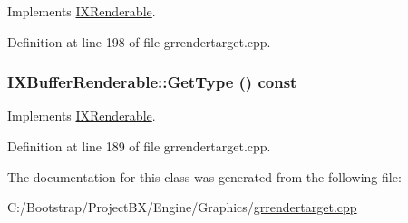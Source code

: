 Implements \hyperlink{class_i_x_renderable_c5ea40caedef9885429ab5c7dccb0163}{IXRenderable}.

Definition at line 198 of file grrendertarget.cpp.\hypertarget{class_i_x_buffer_renderable_6aa2a8e39f8f73f7622761bb1f09ec5b}{
\subsubsection[{GetType}]{ IXBufferRenderable::GetType () const}}
\label{class_i_x_buffer_renderable_6aa2a8e39f8f73f7622761bb1f09ec5b}




Implements \hyperlink{class_i_x_renderable_aa7a8918c305cc562df3f3f44cd761d7}{IXRenderable}.

Definition at line 189 of file grrendertarget.cpp.

The documentation for this class was generated from the following file:\begin{CompactItemize}
\item 
C:/Bootstrap/ProjectBX/Engine/Graphics/\hyperlink{grrendertarget_8cpp}{grrendertarget.cpp}\end{CompactItemize}
